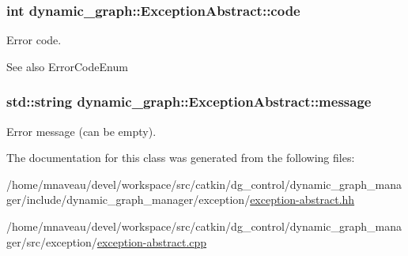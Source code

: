\subsubsection[{\texorpdfstring{code}{code}}]{\setlength{\rightskip}{0pt plus 5cm}int dynamic\+\_\+graph\+::\+Exception\+Abstract\+::code\hspace{0.3cm}{\ttfamily [protected]}}\hypertarget{classdynamic__graph_1_1ExceptionAbstract_a160cf3cd35aad75738f8b26c5cec6fdc}{}\label{classdynamic__graph_1_1ExceptionAbstract_a160cf3cd35aad75738f8b26c5cec6fdc}


Error code. 

\begin{DoxySeeAlso}{See also}
Error\+Code\+Enum 
\end{DoxySeeAlso}
\subsubsection[{\texorpdfstring{message}{message}}]{\setlength{\rightskip}{0pt plus 5cm}std\+::string dynamic\+\_\+graph\+::\+Exception\+Abstract\+::message\hspace{0.3cm}{\ttfamily [protected]}}\hypertarget{classdynamic__graph_1_1ExceptionAbstract_a9622b93d152c08ab80ed4b48ea24380b}{}\label{classdynamic__graph_1_1ExceptionAbstract_a9622b93d152c08ab80ed4b48ea24380b}


Error message (can be empty). 



The documentation for this class was generated from the following files\+:\begin{DoxyCompactItemize}
\item 
/home/mnaveau/devel/workspace/src/catkin/dg\+\_\+control/dynamic\+\_\+graph\+\_\+manager/include/dynamic\+\_\+graph\+\_\+manager/exception/\hyperlink{exception-abstract_8hh}{exception-\/abstract.\+hh}\item 
/home/mnaveau/devel/workspace/src/catkin/dg\+\_\+control/dynamic\+\_\+graph\+\_\+manager/src/exception/\hyperlink{exception-abstract_8cpp}{exception-\/abstract.\+cpp}\end{DoxyCompactItemize}
